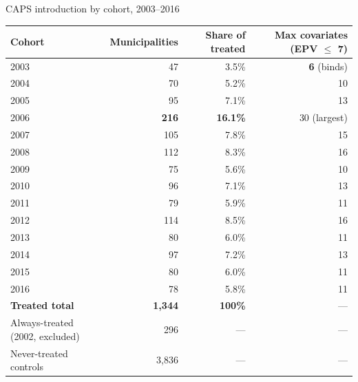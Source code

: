 \documentclass[aspectratio=169,12pt,t]{beamer}
\begin{document}
\begin{frame}{CAPS introduction by cohort, 2003--2016}
\vspace{0.15cm}
\begin{center}
\scriptsize
\setlength{\tabcolsep}{6pt}
\renewcommand{\arraystretch}{0.92}
\begin{tabular}{lrrr}
\toprule
\textbf{Cohort} & \textbf{Municipalities} & \textbf{Share of treated} & \textbf{Max covariates (EPV $\leq$ 7)} \\
\midrule
\rowcolor{remixgreenlight!50} 2003 & 47   & 3.5\%  & \textbf{6} \;(binds) \\
2004 & 70   & 5.2\%  & 10 \\
2005 & 95   & 7.1\%  & 13 \\
\rowcolor{remixgreenlight!50} 2006 & \textbf{216}  & \textbf{16.1\%} & 30 \;(largest) \\
2007 & 105  & 7.8\%  & 15 \\
2008 & 112  & 8.3\%  & 16 \\
2009 & 75   & 5.6\%  & 10 \\
2010 & 96   & 7.1\%  & 13 \\
2011 & 79   & 5.9\%  & 11 \\
2012 & 114  & 8.5\%  & 16 \\
2013 & 80   & 6.0\%  & 11 \\
2014 & 97   & 7.2\%  & 13 \\
2015 & 80   & 6.0\%  & 11 \\
2016 & 78   & 5.8\%  & 11 \\
\midrule
\textbf{Treated total}                   & \textbf{1{,}344} & \textbf{100\%} & --- \\
Always-treated (2002, excluded)          & 296              & ---            & --- \\
Never-treated controls                   & 3{,}836          & ---            & --- \\
\bottomrule
\end{tabular}
\end{center}

\begin{center}
\end{center}
\end{frame}
\end{document}
